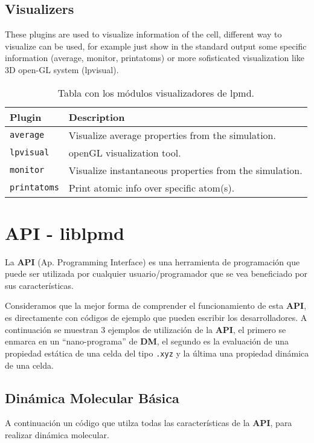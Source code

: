 \section{Visualizers}
These plugins are used to visualize information of the cell, different way to
visualize can be used, for example just show in the standard output some
specific information (average, monitor, printatoms) or more sofisticated
visualization like 3D open-GL system (lpvisual).

\begin{table}[h!]\centering
 \begin{tabular}{|l|p{13cm}|}\hline
 Plugin & Description \\
 \hline\hline
 \texttt{average} & Visualize average properties from the simulation.\\
 \hline
 \texttt{lpvisual} & openGL visualization tool.\\
 \hline
 \texttt{monitor} & Visualize instantaneous properties from the simulation.\\
 \hline
 \texttt{printatoms} & Print atomic info over specific atom(s).\\
 \hline
 \end{tabular}
\label{tab:modgvisual}
\caption{Tabla con los m\'odulos visualizadores de lpmd.}
\end{table}


\chapter{API - liblpmd}
\label{ap:API}

La \textbf{API} (Ap. Programming Interface) es una herramienta de programaci\'on
que puede ser utilizada por cualquier usuario/programador que se vea beneficiado
por sus caracter\'isticas.


Consideramos que la mejor forma de comprender el funcionamiento de esta
\textbf{API}, es directamente con c\'odigos de ejemplo que pueden escribir los
desarrolladores. A continuaci\'on se muestran 3 ejemplos de utilizaci\'on de la
\textbf{API}, el primero se enmarca en un ``nano-programa'' de \textbf{DM}, el
segundo es la evaluaci\'on de una propiedad est\'atica de una celda del tipo
\texttt{.xyz} y la \'ultima una propiedad din\'amica de una celda.

\section{Din\'amica Molecular B\'asica}
A continuaci\'on un c\'odigo que utilza todas las caracter\'isticas de la
\textbf{API}, para realizar din\'amica molecular.

